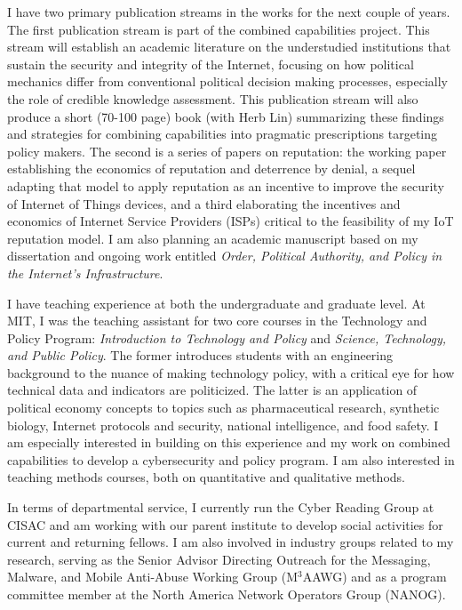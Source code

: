 \documentclass{letter}[12pt]
\begin{document}
\begin{letter}
I have two primary publication streams in the works for the next
couple of years.  The first publication stream is part of the combined
capabilities project.  This stream will establish an academic
literature on the understudied institutions that sustain the security
and integrity of the Internet, focusing on how political mechanics
differ from conventional political decision making processes,
especially the role of credible knowledge assessment.  This
publication stream will also produce a short (70-100 page) book (with
Herb Lin) summarizing these findings and strategies for combining
capabilities into pragmatic prescriptions targeting policy makers.
The second is a series of papers on reputation: the working paper
establishing the economics of reputation and deterrence by denial, a
sequel adapting that model to apply reputation as an incentive to
improve the security of Internet of Things devices, and a third
elaborating the incentives and economics of Internet Service Providers
(ISPs) critical to the feasibility of my IoT reputation model.  I am also planning an academic manuscript based on my dissertation and ongoing work entitled \emph{Order, Political Authority, and Policy in the Internet's Infrastructure}.

I have teaching experience at both the undergraduate and graduate
level.  At MIT, I was the teaching assistant for two core courses in
the Technology and Policy Program: \emph{Introduction to Technology
  and Policy} and \emph{Science, Technology, and Public Policy}.  The
former introduces students with an engineering background to the
nuance of making technology policy, with a critical eye for how
technical data and indicators are politicized.  The latter is an
application of political economy concepts to topics such as
pharmaceutical research, synthetic biology, Internet protocols and
security, national intelligence, and food safety.  I am especially
interested in building on this experience and my work on combined
capabilities to develop a cybersecurity and policy program.  I am also
interested in teaching methods courses, both on quantitative and
qualitative methods.

In terms of departmental service, I currently run the Cyber Reading
Group at CISAC and am working with our parent institute to develop
social activities for current and returning fellows.  I am also
involved in industry groups related to my research, serving as the
Senior Advisor Directing 
Outreach for the Messaging, Malware, and Mobile Anti-Abuse Working
Group (M$^3$AAWG) and as a program committee member at the North
America Network Operators Group (NANOG). 


\end{letter}
\end{document}
